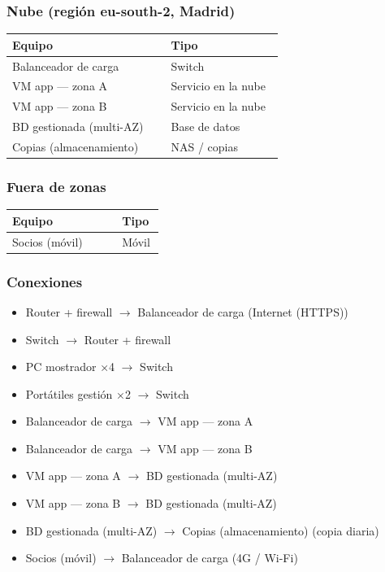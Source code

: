 \subsubsection*{Nube (región eu-south-2, Madrid)}

{\small
\begin{longtable}{@{}>{\raggedright\arraybackslash}p{0.551\linewidth}>{\raggedright\arraybackslash}p{0.398\linewidth}@{}}
\toprule
\textbf{Equipo} & \textbf{Tipo} \\
\midrule
\endhead
Balanceador de carga & Switch \\
VM app — zona A & Servicio en la nube \\
VM app — zona B & Servicio en la nube \\
BD gestionada (multi-AZ) & Base de datos \\
Copias (almacenamiento) & NAS / copias \\
\bottomrule
\end{longtable}}

\subsubsection*{Fuera de zonas}

{\small
\begin{longtable}{@{}>{\raggedright\arraybackslash}p{0.686\linewidth}>{\raggedright\arraybackslash}p{0.263\linewidth}@{}}
\toprule
\textbf{Equipo} & \textbf{Tipo} \\
\midrule
\endhead
Socios (móvil) & Móvil \\
\bottomrule
\end{longtable}}

\subsubsection*{Conexiones}

\begin{itemize}
\item Router + firewall $\rightarrow$ Balanceador de carga (Internet (HTTPS))
\item Switch $\rightarrow$ Router + firewall
\item PC mostrador ×4 $\rightarrow$ Switch
\item Portátiles gestión ×2 $\rightarrow$ Switch
\item Balanceador de carga $\rightarrow$ VM app — zona A
\item Balanceador de carga $\rightarrow$ VM app — zona B
\item VM app — zona A $\rightarrow$ BD gestionada (multi-AZ)
\item VM app — zona B $\rightarrow$ BD gestionada (multi-AZ)
\item BD gestionada (multi-AZ) $\rightarrow$ Copias (almacenamiento) (copia diaria)
\item Socios (móvil) $\rightarrow$ Balanceador de carga (4G / Wi-Fi)
\end{itemize}

